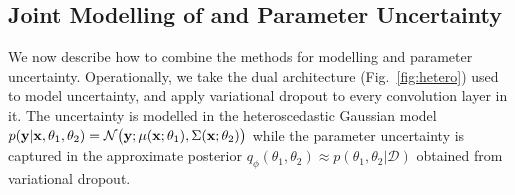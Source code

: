 % 
%
%
%
\subsection{Joint Modelling of  and Parameter Uncertainty}
We now describe how to combine the methods for modelling  and parameter uncertainty. Operationally, we take the dual architecture (Fig.~\ref{fig:hetero}) used to model  uncertainty, and apply variational dropout to every convolution layer in it. The  uncertainty is modelled in the heteroscedastic Gaussian model $p(\mathbf{y}|\mathbf{x}, \theta_1, \theta_2) = \mathcal{N}\big{(}\mathbf{y}; \mu(\mathbf{x};\theta_1),\Sigma(\mathbf{x};\theta_2)\big{)}$ while the parameter uncertainty is captured in the approximate posterior $q_{\phi}(\theta_1, \theta_2) \approx p(\theta_1, \theta_2|\mathcal{D}) $ obtained from variational dropout. 

